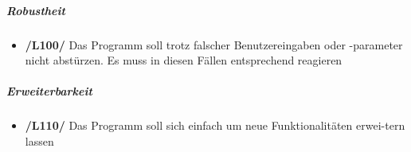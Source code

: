 \documentclass{article}
\begin{document}
\subparagraph{Robustheit}

\begin{itemize}
\item{\textbf{/L100/} Das Programm soll trotz falscher Benutzereingaben oder -parameter nicht abstürzen. Es muss in diesen Fällen entsprechend reagieren}

\end{itemize}

\subparagraph{Erweiterbarkeit}

\begin{itemize}
\item{\textbf{/L110/} Das Programm soll sich einfach um neue Funktionalitäten erwei-tern lassen}
\end{itemize}
\end{document}
